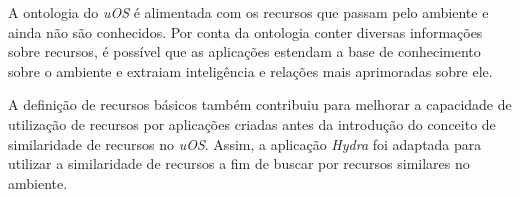A ontologia do \emph{uOS} é alimentada com os recursos que passam pelo ambiente e ainda não são conhecidos. Por conta da ontologia conter diversas informações sobre recursos, é possível que as aplicações estendam a base de conhecimento sobre o ambiente e extraiam inteligência e relações mais aprimoradas sobre ele.

A definição de recursos básicos também contribuiu para melhorar a capacidade de utilização de recursos por aplicações criadas antes da introdução do conceito de similaridade de recursos no \emph{uOS}. Assim, a aplicação \emph{Hydra} foi adaptada para utilizar a similaridade de recursos a fim de buscar por recursos similares no ambiente.


